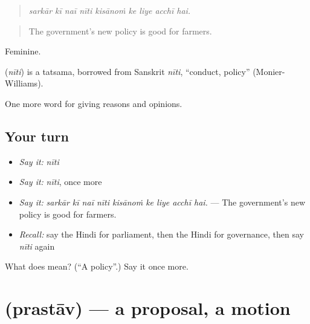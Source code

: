 \begin{quote}
        
\end{quote}

\begin{quote}
\emph{sarkār kī naī nīti kisānoṁ ke liye acchī hai.}
\end{quote}

\begin{quote}
The government's new policy is good for farmers.
\end{quote}

Feminine.

\begin{cousinweb}
\textbf{} (\emph{nīti}) is a tatsama, borrowed from Sanskrit \emph{nīti}, \textquotedblleft{}conduct, policy\textquotedblright{} (Monier-Williams).
\end{cousinweb}

\begin{grammarlens}[title={What you've built}]
One more word for giving reasons and opinions.
\end{grammarlens}

\subsection*{Your turn}
\begin{itemize}
\raggedright
  \item \emph{Say it:} \emph{nīti}
  \item \emph{Say it:} \emph{nīti}, once more
  \item \emph{Say it:} \emph{sarkār kī naī nīti kisānoṁ ke liye acchī hai.} — The government's new policy is good for farmers.
  \item \emph{Recall:} say the Hindi for parliament, then the Hindi for governance, then say \emph{nīti} again
\end{itemize}

\begin{tcolorbox}[breakable,colback=teal!4,colframe=teal!35!black,title={Before you move on}]
What does  mean? (\textquotedblleft{}A policy\textquotedblright{}.) Say it once more.
\end{tcolorbox}
\section[\texorpdfstring{\hi{प्रस्ताव} (prastāv)}{प्रस्ताव (prastāv)}]{ (prastāv) — a proposal, a motion}


